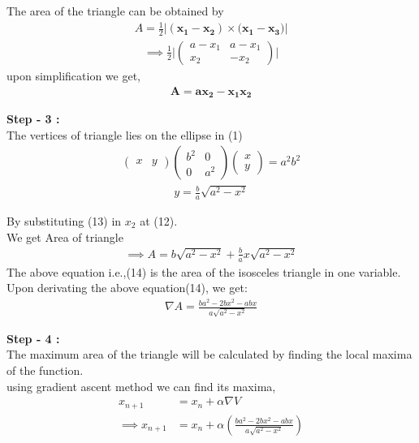\documentclass[10pt,a4paper]{report}
\newcommand{\myvec}[1]{\ensuremath{\begin{pmatrix}#1\end{pmatrix}}}
\let\vec\mathbf
\providecommand{\brak}[1]{\ensuremath{\left(#1\right)}}
\begin{document}
The area of the triangle can be obtained by
\begin{align}
A=\frac{1}{2} |(\vec{x_1}- \vec{x_2}) \times (\vec{x_1} - \vec{x_3)}|
\end{align}
\begin{align}
\implies \frac{1}{2} \Big| \myvec{a-x_1 & a-x_1\\x_2 & -x_2} \Big|
\end{align}
upon simplification we get,
\begin{align}
\vec{A}=\vec{ax_2-x_1x_2}
\end{align}

\raggedright \textbf{Step - 3 :}\\ \vspace{2mm}
The vertices of triangle lies on the ellipse in (1)
\begin{align*}
\myvec{x&y}\myvec{b^2&0\\0&a^2}\myvec{x\\y}=a^2b^2
\end{align*}
\begin{align}
y=\frac{b}{a}\sqrt{a^2-x^2}
\end{align}

\centering By substituting (13) in $x_2$ at (12). \\We get Area of triangle
\begin{align}
\implies A=b\sqrt{a^2-x^2}+\frac{b}{a}x\sqrt{a^2-x^2}
\end{align}
The above equation i.e.,(14) is the area of the isosceles triangle in one variable.\\
Upon derivating the above equation(14), we get:
\begin{align}
\nabla A = \frac{ba^2-2bx^2-abx}{a\sqrt{a^2-x^2}}
\end{align}

\raggedright \textbf{Step - 4 :}\\ \vspace{2mm}
The maximum area of the triangle will be calculated by finding the local maxima of the function.\\
using gradient ascent method we can find its maxima,
\begin{align}
x_{n+1} &= x_n + \alpha \nabla V \\
\implies x_{n+1} &= x_n + \alpha \brak{\frac{ba^2-2bx^2-abx}{a\sqrt{a^2-x^2}}}
\end{align}
\end{document}
